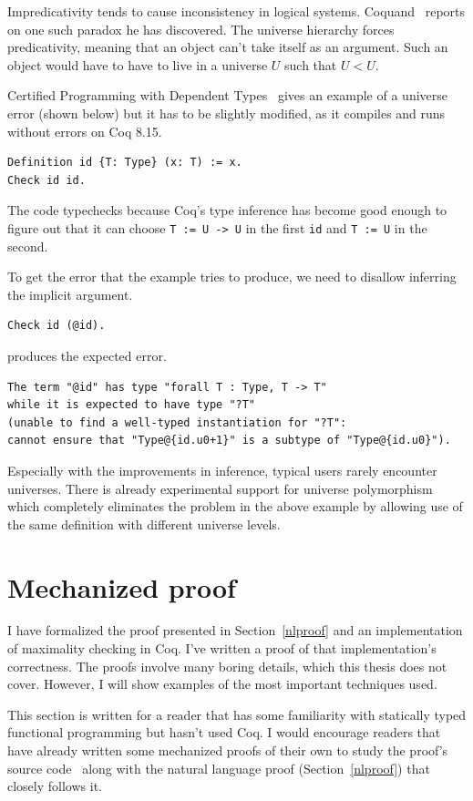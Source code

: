 \documentclass[english, 12pt, a4paper, sci, a-1b, online]{aaltothesis}
\newcommand\icoq[1]{\texttt{#1}}
\begin{document}
Impredicativity tends to cause inconsistency in logical systems. Coquand~\cite{newParadox} reports on one such paradox he has discovered. The universe hierarchy forces predicativity, meaning that an object can't take itself as an argument. Such an object would have to have to live in a universe $U$ such that $U < U$.

Certified Programming with Dependent Types~\cite{CPDT} gives an example of a universe error (shown below) but it has to be slightly modified, as it compiles and runs without errors on Coq 8.15.
\begin{verbatim}
Definition id {T: Type} (x: T) := x.
Check id id.
\end{verbatim}
The code typechecks because Coq's type inference has become good enough to figure out that it can choose \icoq{T := U -> U} in the first \icoq{id} and \icoq{T := U} in the second.

To get the error that the example tries to produce, we need to disallow inferring the implicit argument.
\begin{verbatim}
Check id (@id).
\end{verbatim}
produces the expected error.
\begin{verbatim}
The term "@id" has type "forall T : Type, T -> T"
while it is expected to have type "?T"
(unable to find a well-typed instantiation for "?T":
cannot ensure that "Type@{id.u0+1}" is a subtype of "Type@{id.u0}").
\end{verbatim}

Especially with the improvements in inference, typical users rarely encounter universes. There is already experimental support for universe polymorphism~\cite{coqRefman} which completely eliminates the problem in the above example by allowing use of the same definition with different universe levels.

\section{Mechanized proof}\label{mechproof}

I have formalized the proof presented in Section~\ref{nlproof} and an implementation of maximality checking in Coq. I've written a proof of that implementation's correctness. The proofs involve many boring details, which this thesis does not cover. However, I will show examples of the most important techniques used.

This section is written for a reader that has some familiarity with statically typed functional programming but hasn't used Coq. I would encourage readers that have already written some mechanized proofs of their own to study the proof's source code~\cite{source_code} along with the natural language proof (Section~\ref{nlproof}) that closely follows it.
\end{document}
